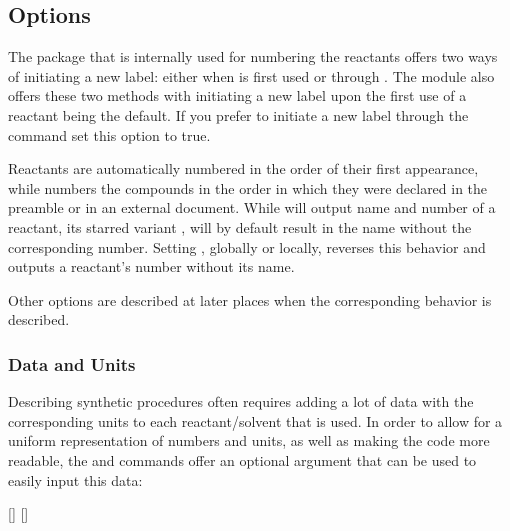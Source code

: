 \documentclass{chemmacros-manual}
\begin{document}
\subsection{Options}
\begin{options}
    The  package that is internally used for numbering the
    reactants offers two ways of initiating a new label: either when 
    is first used or through .  The  module
    also offers these two methods with initiating a new label upon the first
    use of a reactant being the default.   If you prefer to initiate a
    new label through the  command set this option to
    true.

    Reactants are automatically numbered in the order of their first
    appearance, while  numbers the compounds in the order in
    which they were declared in the preamble or in an external document.
    While  will output name and number of a reactant, its
    starred variant \sarg, will by default result in the name
    without the corresponding number. Setting , globally
    or locally, reverses this behavior and outputs a reactant's number without
    its name.
\end{options}
Other options are described at later places when the corresponding behavior is
described.

\subsubsection{Data and Units}

Describing synthetic procedures often requires adding a lot of data with the
corresponding units to each reactant/solvent that is used. In order to allow
for a uniform representation of numbers and units, as well as making the code
more readable, the  and  commands offer an optional
argument that can be used to easily input this data:

\begin{commands}
  []
    \phantom{X}\vspace*{-\baselineskip}
  []
    \phantom{X}\vspace*{-\baselineskip}
\end{commands}
\end{document}
